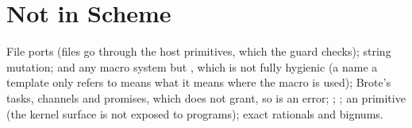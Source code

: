\section{Not in \nodwyn{} Scheme}

File ports (files go through the host primitives, which the guard checks);
string mutation;  and any macro system but
, which is not fully hygienic (a name a template only
refers to means what it means where the macro is used); Brote's tasks,
channels and promises, which \nodwyn{} does not grant, so  is an
error; ; ; an  primitive (the
kernel surface is not exposed to programs); exact rationals and bignums.
